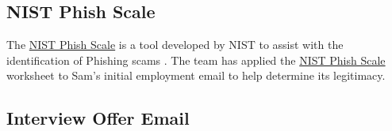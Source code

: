 \begin{fullwidth}
\section{NIST Phish Scale} %

The \hyperref[sec:NIST Phish Scale]{NIST Phish Scale} is a tool developed by NIST to assist with the identification of Phishing scams \autocite{Dawkins:2023}. The team has applied the \hyperref[sec:NIST Phish Scale]{NIST Phish Scale} worksheet to Sam's initial employment email to help determine its legitimacy.

\subsection{Interview Offer Email}


\end{fullwidth}
